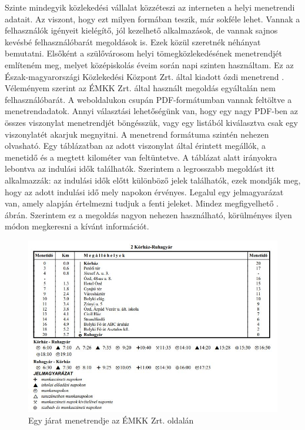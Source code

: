 


Szinte mindegyik közlekedési vállalat közzéteszi az interneten a helyi menetrendi adatait. Az viszont, hogy ezt milyen formában teszik, már sokféle lehet. Vannak a felhasználók igényeit kielégítő, jól kezelhető alkalmazások, de vannak sajnos kevésbé felhasználóbarát megoldások is. Ezek közül szeretnék néhányat bemutatni.
Elsőként a szülővárosom helyi tömegközlekedésének menetrendjét említeném meg, melyet középiskolás éveim során napi szinten használtam. Ez az Észak-magyarországi Közlekedési Központ Zrt. által kiadott ózdi menetrend \cite{emkk}. Véleményem szerint az ÉMKK Zrt. által használt megoldás egyáltalán nem felhasználóbarát. A weboldalukon csupán PDF-formátumban vannak feltöltve a menetrendadatok. Annyi választási lehetőségünk van, hogy egy nagy PDF-ben az összes viszonylat menetrendjét böngésszük, vagy egy listából kiválasztva csak egy viszonylatét akarjuk megnyitni. A menetrend formátuma szintén nehezen olvasható. Egy táblázatban az adott viszonylat által érintett megállók, a menetidő és a megtett kilométer van feltüntetve. A táblázat alatt irányokra lebontva az indulási idők találhatók. Szerintem a legrosszabb megoldást itt alkalmazzák: az indulási idők előtt különböző jelek találhatók, ezek mondják meg, hogy az adott indulási idő mely napokon érvényes. Legalul egy jelmagyarázat van, amely alapján értelmezni tudjuk a fenti jeleket. Mindez megfigyelhető . ábrán. Szerintem ez a megoldás nagyon nehezen használható, körülményes ilyen módon megkeresni a kívánt információt.

\begin{figure}[h!]
\centering
\includegraphics[scale=0.7]{kepek/EMKK_menetrend.jpg}
\caption{Egy járat menetrendje az ÉMKK Zrt. oldalán}
\label{fig:EMKK_menetrend}
\end{figure}

